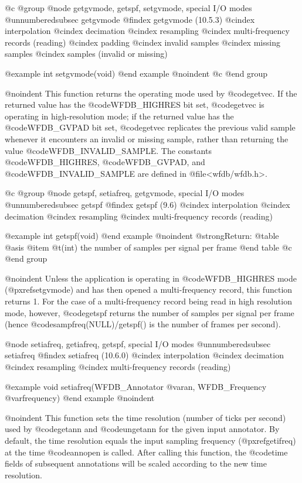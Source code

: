 {{{{{{{{@c @group
@node     getgvmode, getspf, setgvmode, special I/O modes
@unnumberedsubsec getgvmode
@findex getgvmode (10.5.3)
@cindex interpolation
@cindex decimation
@cindex resampling
@cindex multi-frequency records (reading)
@cindex padding
@cindex invalid samples
@cindex missing samples
@cindex samples (invalid or missing)

@example
int setgvmode(void)
@end example
@noindent
@c @end group

@noindent
This function returns the operating mode used by @code{getvec}.  If the
returned value has the @code{WFDB_HIGHRES} bit set, @code{getvec} is operating
in high-resolution mode;  if the returned value has the @code{WFDB_GVPAD} bit
set, @code{getvec} replicates the previous valid sample whenever it encounters
an invalid or missing sample, rather than returning the value
@code{WFDB_INVALID_SAMPLE}.  The constants @code{WFDB_HIGHRES},
@code{WFDB_GVPAD}, and @code{WFDB_INVALID_SAMPLE} are defined in
@file{<wfdb/wfdb.h>}.

@c @group
@node     getspf, setiafreq, getgvmode, special I/O modes
@unnumberedsubsec getspf
@findex getspf (9.6)
@cindex interpolation
@cindex decimation
@cindex resampling
@cindex multi-frequency records (reading)

@example
int getspf(void)
@end example
@noindent
@strong{Return:}
@table @asis
@item @t{(int)}
the number of samples per signal per frame
@end table
@c @end group

@noindent
Unless the application is operating in @code{WFDB_HIGHRES} mode
(@pxref{setgvmode}) and has then opened a multi-frequency record, this
function returns 1.  For the case of a multi-frequency record being read
in high resolution mode, however, @code{getspf} returns the number of
samples per signal per frame (hence @code{sampfreq(NULL)/getspf()} is
the number of frames per second).

@node     setiafreq, getiafreq, getspf, special I/O modes
@unnumberedsubsec setiafreq
@findex setiafreq (10.6.0)
@cindex interpolation
@cindex decimation
@cindex resampling
@cindex multi-frequency records (reading)

@example
void setiafreq(WFDB_Annotator @var{an}, WFDB_Frequency @var{frequency})
@end example
@noindent

@noindent
This function sets the time resolution (number of ticks per second) used by
@code{getann} and @code{ungetann} for the given input annotator.  By default,
the time resolution equals the input sampling frequency (@pxref{getifreq}) at
the time @code{annopen} is called.  After calling this function, the @code{time}
fields of subsequent annotations will be scaled according to the new time
resolution.

}}}}}}}}
